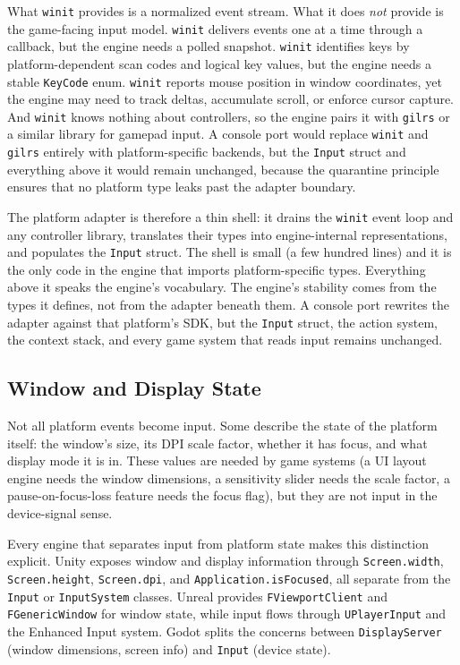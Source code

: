 \documentclass[
  11pt,
  letterpaper,
  DIV=11,
  numbers=noendperiod,
  twoside,
  open=right]{scrreprt}
\begin{document}
What \texttt{winit} provides is a normalized event stream. What it does
\emph{not} provide is the game-facing input model. \texttt{winit}
delivers events one at a time through a callback, but the engine needs a
polled snapshot. \texttt{winit} identifies keys by platform-dependent
scan codes and logical key values, but the engine needs a stable
\texttt{KeyCode} enum. \texttt{winit} reports mouse position in window
coordinates, yet the engine may need to track deltas, accumulate scroll,
or enforce cursor capture. And \texttt{winit} knows nothing about
controllers, so the engine pairs it with \texttt{gilrs} or a similar
library for gamepad input. A console port would replace \texttt{winit}
and \texttt{gilrs} entirely with platform-specific backends, but the
\texttt{Input} struct and everything above it would remain unchanged,
because the quarantine principle ensures that no platform type leaks
past the adapter boundary.

The platform adapter is therefore a thin shell: it drains the
\texttt{winit} event loop and any controller library, translates their
types into engine-internal representations, and populates the
\texttt{Input} struct. The shell is small (a few hundred lines) and it
is the only code in the engine that imports platform-specific types.
Everything above it speaks the engine's vocabulary. The engine's
stability comes from the types it defines, not from the adapter beneath
them. A console port rewrites the adapter against that platform's SDK,
but the \texttt{Input} struct, the action system, the context stack, and
every game system that reads input remains unchanged.

\subsection{Window and Display State}\label{window-and-display-state}

Not all platform events become input. Some describe the state of the
platform itself: the window's size, its DPI scale factor, whether it has
focus, and what display mode it is in. These values are needed by game
systems (a UI layout engine needs the window dimensions, a sensitivity
slider needs the scale factor, a pause-on-focus-loss feature needs the
focus flag), but they are not input in the device-signal sense.

Every engine that separates input from platform state makes this
distinction explicit. Unity exposes window and display information
through \texttt{Screen.width}, \texttt{Screen.height},
\texttt{Screen.dpi}, and \texttt{Application.isFocused}, all separate
from the \texttt{Input} or \texttt{InputSystem} classes. Unreal provides
\texttt{FViewportClient} and \texttt{FGenericWindow} for window state,
while input flows through \texttt{UPlayerInput} and the Enhanced Input
system. Godot splits the concerns between \texttt{DisplayServer} (window
dimensions, screen info) and \texttt{Input} (device state).
\end{document}
